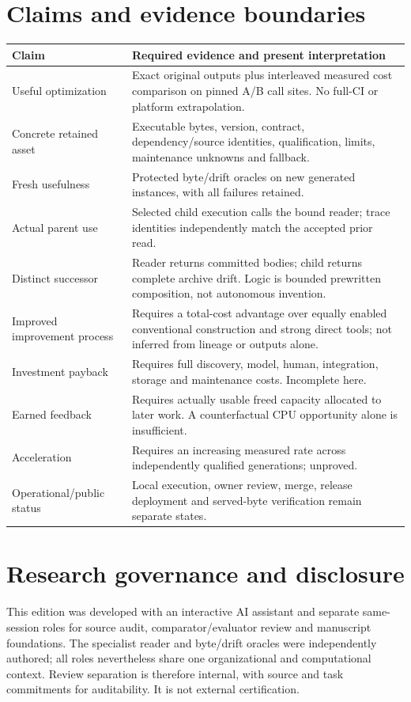 \documentclass[11pt,a4paper]{article}
\begin{document}
\section{Claims and evidence boundaries}
\begin{longtable}{@{}p{}p{}@{}}\toprule
Claim & Required evidence and present interpretation\\\midrule\endhead
Useful optimization & Exact original outputs plus interleaved measured cost comparison on pinned A/B call sites. No full-CI or platform extrapolation.\\
Concrete retained asset & Executable bytes, version, contract, dependency/source identities, qualification, limits, maintenance unknowns and fallback.\\
Fresh usefulness & Protected byte/drift oracles on new generated instances, with all failures retained.\\
Actual parent use & Selected child execution calls the bound reader; trace identities independently match the accepted prior read.\\
Distinct successor & Reader returns committed bodies; child returns complete archive drift. Logic is bounded prewritten composition, not autonomous invention.\\
Improved improvement process & Requires a total-cost advantage over equally enabled conventional construction and strong direct tools; not inferred from lineage or outputs alone.\\
Investment payback & Requires full discovery, model, human, integration, storage and maintenance costs. Incomplete here.\\
Earned feedback & Requires actually usable freed capacity allocated to later work. A counterfactual CPU opportunity alone is insufficient.\\
Acceleration & Requires an increasing measured rate across independently qualified generations; unproved.\\
Operational/public status & Local execution, owner review, merge, release deployment and served-byte verification remain separate states.\\\bottomrule
\end{longtable}

\section{Research governance and disclosure}

This edition was developed with an interactive AI assistant and separate same-session roles for source audit, comparator/evaluator review and manuscript foundations. The specialist reader and byte/drift oracles were independently authored; all roles nevertheless share one organizational and computational context. Review separation is therefore internal, with source and task commitments for auditability. It is not external certification.
\end{document}
